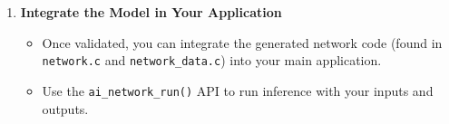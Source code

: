 \documentclass{article}
\begin{document}
\begin{enumerate}
    \item \textbf{Integrate the Model in Your Application}
    \begin{itemize}
        \item Once validated, you can integrate the generated network code (found in \texttt{network.c} and \texttt{network\_data.c}) into your main application.
        \item Use the \texttt{ai\_network\_run()} API to run inference with your inputs and outputs.
    \end{itemize}
\end{enumerate}
\end{document}
